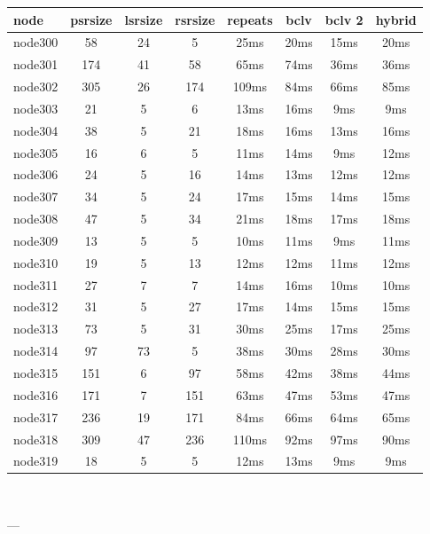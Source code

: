 \begin{tabular}{|l|c|c|c|c|c|c|c|}
\hline node & psrsize & lsrsize & rsrsize   & repeats & bclv & bclv 2 & hybrid\\
    \hline node300 & 58 & 24 & 5 & 25ms & 20ms & 15ms & 20ms\\
    \hline node301 & 174 & 41 & 58 & 65ms & 74ms & 36ms & 36ms\\
    \hline node302 & 305 & 26 & 174 & 109ms & 84ms & 66ms & 85ms\\
    \hline node303 & 21 & 5 & 6 & 13ms & 16ms & 9ms & 9ms\\
    \hline node304 & 38 & 5 & 21 & 18ms & 16ms & 13ms & 16ms\\
    \hline node305 & 16 & 6 & 5 & 11ms & 14ms & 9ms & 12ms\\
    \hline node306 & 24 & 5 & 16 & 14ms & 13ms & 12ms & 12ms\\
    \hline node307 & 34 & 5 & 24 & 17ms & 15ms & 14ms & 15ms\\
    \hline node308 & 47 & 5 & 34 & 21ms & 18ms & 17ms & 18ms\\
    \hline node309 & 13 & 5 & 5 & 10ms & 11ms & 9ms & 11ms\\
    \hline node310 & 19 & 5 & 13 & 12ms & 12ms & 11ms & 12ms\\
    \hline node311 & 27 & 7 & 7 & 14ms & 16ms & 10ms & 10ms\\
    \hline node312 & 31 & 5 & 27 & 17ms & 14ms & 15ms & 15ms\\
    \hline node313 & 73 & 5 & 31 & 30ms & 25ms & 17ms & 25ms\\
    \hline node314 & 97 & 73 & 5 & 38ms & 30ms & 28ms & 30ms\\
    \hline node315 & 151 & 6 & 97 & 58ms & 42ms & 38ms & 44ms\\
    \hline node316 & 171 & 7 & 151 & 63ms & 47ms & 53ms & 47ms\\
    \hline node317 & 236 & 19 & 171 & 84ms & 66ms & 64ms & 65ms\\
    \hline node318 & 309 & 47 & 236 & 110ms & 92ms & 97ms & 90ms\\
    \hline node319 & 18 & 5 & 5 & 12ms & 13ms & 9ms & 9ms\\

\hline
\end{tabular} \

---


